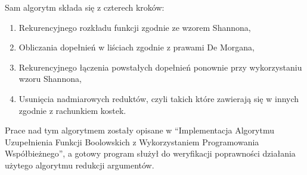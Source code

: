 Sam algorytm składa się z czterech kroków:
\begin{enumerate}
\item Rekurencyjnego rozkładu funkcji zgodnie ze wzorem Shannona,
\item Obliczania dopełnień w liściach zgodnie z prawami De Morgana,
\item Rekurencyjnego łączenia powstałych dopełnień ponownie przy wykorzystaniu wzoru Shannona,
\item Usunięcia nadmiarowych reduktów,
czyli takich które zawierają się w innych zgodnie z rachunkiem kostek.
\end{enumerate}
Prace nad tym algorytmem zostały opisane w “Implementacja Algorytmu Uzupełnienia Funkcji Boolowskich z Wykorzystaniem Programowania Współbieżnego”,
a gotowy program służył do weryfikacji poprawności działania użytego algorytmu redukcji argumentów.
